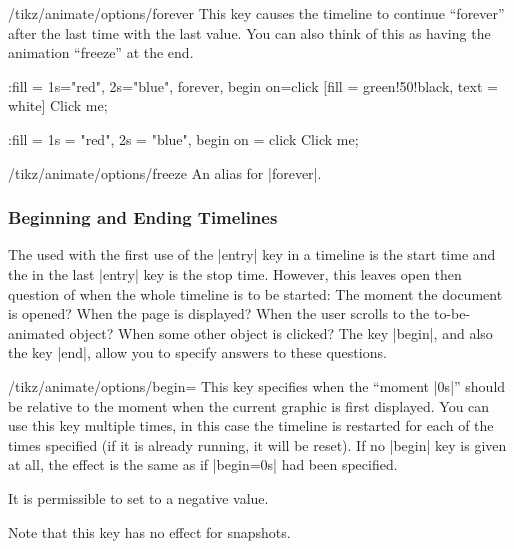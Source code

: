 \begin{key}{/tikz/animate/options/forever}
    This key causes the timeline to continue ``forever'' after the last time
    with the last value. You can also think of this as having the animation
    ``freeze'' at the end.
\begin{codeexample}[
    preamble={\usetikzlibrary{animations}},
    animation list = {0.5,1,1.5,2,2.5},
]
\tikz \node :fill = { 1s="red", 2s="blue", forever, begin on=click}
  [fill = green!50!black, text = white] {Click me};
\end{codeexample}
\begin{codeexample}[
    preamble={\usetikzlibrary{animations}},
    animation list = {0.5,1,1.5,2,2.5},
]
\tikz \node [fill = green!50!black, text = white]
    :fill = { 1s = "red", 2s = "blue", begin on = click }
  {Click me};
\end{codeexample}
\end{key}

\begin{key}{/tikz/animate/options/freeze}
    An alias for |forever|.
\end{key}


\subsubsection{Beginning and Ending Timelines}
\label{section-anim-begin-end}

The  used with the first use of the |entry| key in a timeline is the
start time and the  in the last |entry| key is the stop time.
However, this leaves open then question of when the whole timeline is to be
started: The moment the document is opened? When the page is displayed? When
the user scrolls to the to-be-animated object? When some other object is
clicked? The key |begin|, and also the key |end|, allow you to specify answers
to these questions.

\begin{key}{/tikz/animate/options/begin=}
    This key specifies when the ``moment |0s|'' should be relative to the
    moment when the current graphic is first displayed. You can use this key
    multiple times, in this case the timeline is restarted for each of the
    times specified (if it is already running, it will be reset). If no |begin|
    key is given at all, the effect is the same as if |begin=0s| had been
    specified.

    It is permissible to set  to a negative value.

    Note that this key has no effect for snapshots.
\end{key}

